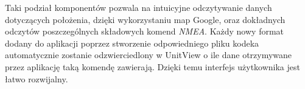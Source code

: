 \documentclass[skorowidz,skroty]{dyplomWEZUT}
\begin{document}
	Taki podział komponentów pozwala na intuicyjne odczytywanie danych dotyczących położenia, dzięki wykorzystaniu map Google, oraz dokładnych odczytów poszczególnych składowych komend \textit{NMEA}. Każdy nowy format dodany do aplikacji poprzez stworzenie odpowiedniego pliku kodeka automatycznie zostanie odzwierciedlony w UnitView o ile dane otrzymywane przez aplikację taką komendę zawierają. Dzięki temu interfejs użytkownika jest łatwo rozwijalny.


%
%
%
%
\end{document}
